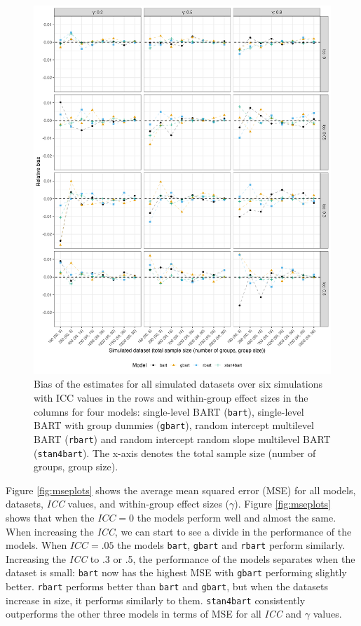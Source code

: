 \documentclass[10pt, a4paper, titlepage]{article}
\begin{document}
\begin{figure}[H]
\caption{Bias of the estimates for all simulated datasets over six simulations with ICC values in the rows and within-group effect sizes in the columns for four models: single-level BART (\texttt{bart}), single-level BART with group dummies (\texttt{gbart}), random intercept multilevel BART (\texttt{rbart}) and random intercept random slope multilevel BART (\texttt{stan4bart}). The x-axis denotes the total sample size (number of groups, group size).}
\centering
\label{fig:biasplots}
\includegraphics[width=1\textwidth]{biasplot.png}
\end{figure}

Figure \ref{fig:mseplots} shows the average mean squared error (MSE) for all models, datasets, \textit{ICC} values, and within-group effect sizes ($\gamma$). Figure \ref{fig:mseplots} shows that when the $ICC = 0$ the models perform well and almost the same. When increasing the \textit{ICC}, we can start to see a divide in the performance of the models. When $ICC = .05$ the models \texttt{bart}, \texttt{gbart} and \texttt{rbart} perform similarly. Increasing the \textit{ICC} to .3 or .5, the performance of the models separates when the dataset is small: \texttt{bart} now has the highest MSE with \texttt{gbart} performing slightly better. \texttt{rbart} performs better than \texttt{bart} and \texttt{gbart}, but when the datasets increase in size, it performs similarly to them. \texttt{stan4bart} consistently outperforms the other three models in terms of MSE for all \textit{ICC} and $\gamma$ values.
\end{document}
